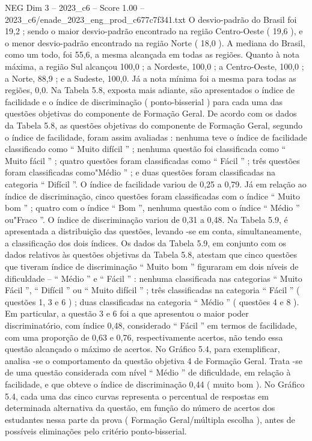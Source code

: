 \begin{textsample}{NEG Dim 3 – 2023\_c6 – Score 1.00 – 2023\_c6/enade\_2023\_eng\_prod\_c677c7f341.txt}
O desvio-padrão do Brasil foi 19,2 ; sendo o maior desvio-padrão encontrado na região Centro-Oeste ( 19,6 ), e o menor desvio-padrão encontrado na região Norte ( 18,0 ).
A mediana do Brasil, como um todo, foi 55,6, a mesma alcançada em todas as regiões.
Quanto à nota máxima, a região Sul alcançou 100,0 ; a Nordeste, 100,0 ; a Centro-Oeste, 100,0 ; a Norte, 88,9 ; e a Sudeste, 100,0.
Já a nota mínima foi a mesma para todas as regiões, 0,0.
Na Tabela 5.8, exposta mais adiante, são apresentados o índice de facilidade e o índice de discriminação ( ponto-bisserial ) para cada uma das questões objetivas do componente de Formação Geral.
De acordo com os dados da Tabela 5.8, as questões objetivas do componente de Formação Geral, segundo o índice de facilidade, foram assim avaliadas : nenhuma teve o índice de facilidade classificado como “ Muito difícil ” ; nenhuma questão foi classificada como “ Muito fácil ” ; quatro questões foram classificadas como “ Fácil ” ; três questões foram classificadas como"Médio ” ; e duas questões foram classificadas na categoria “ Difícil ”.
O índice de facilidade variou de 0,25 a 0,79.
Já em relação ao índice de discriminação, cinco questões foram classificadas com o índice “ Muito bom ” ; quatro com o índice “ Bom ”, nenhuma questão com o índice “ Médio ” ou"Fraco ”.
O índice de discriminação variou de 0,31 a 0,48.
Na Tabela 5.9, é apresentada a distribuição das questões, levando -se em conta, simultaneamente, a classificação dos dois índices.
Os dados da Tabela 5.9, em conjunto com os dados relativos às questões objetivas da Tabela 5.8, atestam que cinco questões que tiveram índice de discriminação “ Muito bom ” figuraram em dois níveis de dificuldade – “ Médio ” e “ Fácil ” : nenhuma classificada nas categorias “ Muito Fácil ”, “ Difícil ” ou “ Muito difícil ” ; três classificadas na categoria “ Fácil ” ( questões 1, 3 e 6 ) ; duas classificadas na categoria “ Médio ” ( questões 4 e 8 ).
Em particular, a questão 3 e 6 foi a que apresentou o maior poder discriminatório, com índice 0,48, considerado “ Fácil ” em termos de facilidade, com uma proporção de 0,63 e 0,76, respectivamente acertos, não tendo essa questão alcançado o máximo de acertos.
No Gráfico 5.4, para exemplificar, analisa -se o comportamento da questão objetiva 4 de Formação Geral.
Trata -se de uma questão considerada com nível “ Médio ” de dificuldade, em relação à facilidade, e que obteve o índice de discriminação 0,44 ( muito bom ).
No Gráfico 5.4, cada uma das cinco curvas representa o percentual de respostas em determinada alternativa da questão, em função do número de acertos dos estudantes nessa parte da prova ( Formação Geral/múltipla escolha ), antes de possíveis eliminações pelo critério ponto-bisserial.

\end{textsample}
